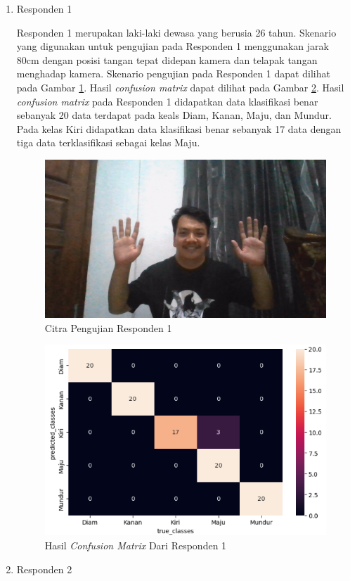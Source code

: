 \begin{enumerate}
  \item Responden 1 \par
  Responden 1 merupakan laki-laki dewasa yang berusia 26 tahun. Skenario yang digunakan untuk pengujian pada Responden 1 menggunakan jarak 80cm dengan posisi tangan tepat didepan kamera dan telapak tangan menghadap kamera. Skenario pengujian pada Responden 1 dapat dilihat pada Gambar \ref{fig:skenarioriko}. Hasil \emph{confusion matrix} dapat dilihat pada Gambar \ref{fig:cmriko}. Hasil \emph{confusion matrix} pada Responden 1 didapatkan data klasifikasi benar sebanyak 20 data terdapat pada keals Diam, Kanan, Maju, dan Mundur. Pada kelas Kiri didapatkan data klasifikasi benar sebanyak 17 data dengan tiga data terklasifikasi sebagai kelas Maju.
    \begin{figure}[H]
      \centering
      \includegraphics[width=0.7\linewidth]{../Gambar/skenarioriko.jpg}
      \caption{Citra Pengujian Responden 1}
      \label{fig:skenarioriko}
    \end{figure}
    \begin{figure}[H]
      \centering
      \includegraphics[width=0.7\linewidth]{../Gambar/cmriko.png}
      \caption{Hasil \emph{Confusion Matrix} Dari Responden 1}
      \label{fig:cmriko}
    \end{figure}
  \item Responden 2 \par

\end{enumerate}
